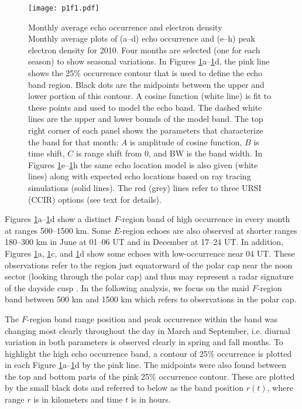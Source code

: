 \begin{figure}
	\centering
	\texttt{[image: p1f1.pdf]}
	\caption[Monthly average echo occurrence and electron density]{{\:}Monthly average echo occurrence and electron density\\ Monthly average plots of (a--d) echo occurrence and (e--h) peak electron density for 2010.  Four months are selected (one for each season) to show seasonal variations. In Figures \ref{fig:month_avg_occ}a--\ref{fig:month_avg_occ}d,  the pink line shows the 25\% occurrence contour that is used to define the echo band region. Black dots are the midpoints between the upper and lower portion of this contour.  A cosine function (white line) is fit to these points and used to model the echo band. The dashed white lines are the upper and lower bounds of the model band. The top right corner of each panel shows the parameters that characterize the band for that month: \(A\) is amplitude of cosine function, \(B\) is time shift, \(C\) is range shift from 0, and BW is the band width.  In Figures \ref{fig:month_avg_occ}e--\ref{fig:month_avg_occ}h the same echo location model is also given (white lines) along with expected echo locations based on ray tracing simulations (solid lines).  The red (grey) lines refer to three URSI (CCIR) options (see text for details).}
	\label{fig:month_avg_occ}
\end{figure}

Figures \ref{fig:month_avg_occ}a--\ref{fig:month_avg_occ}d show a distinct \(F\)-region band of high occurrence in every month at ranges 500--1500 km. Some \(E\)-region echoes are also observed at shorter ranges 180--300 km in June at 01--06 UT and in December at 17--24 UT.  In addition, Figures \ref{fig:month_avg_occ}a, \ref{fig:month_avg_occ}c, and \ref{fig:month_avg_occ}d show some echoes with low-occurrence near 04 UT.  These observations refer to the region just equatorward of the polar cap near the noon sector (looking through the polar cap) and thus may represent a radar signature of the dayside cusp \citep{Yeoman2002}.  In the following analysis, we focus on the maid \(F\)-region band between 500 km and 1500 km which refers to observations in the polar cap.

The \(F\)-region band range position and peak occurrence within the band was changing most clearly throughout the day in March and September, i.e. diurnal variation in both parameters is observed clearly in spring and fall months. To highlight the high echo occurrence band, a contour of 25\% occurrence is plotted in each Figure \ref{fig:month_avg_occ}a--\ref{fig:month_avg_occ}d by the pink line.  The midpoints were also found between the top and bottom parts of the pink 25\% occurrence contour.  These are plotted by the small black dots and referred to below as the band position \(r(t)\), where range \(r\) is in kilometers and time \(t\) is in hours.

